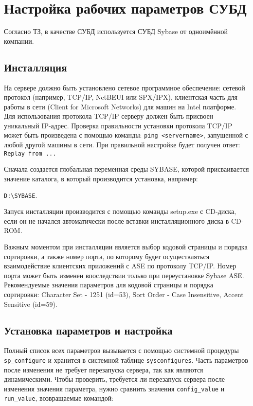\newpage

\section{Настройка рабочих параметров СУБД}

Согласно ТЗ, в качестве СУБД используется СУБД Sybase от одноимённой компании.

\subsection{Инсталляция}

На сервере должно быть установлено сетевое программное обеспечение: сетевой протокол (например, TCP/IP, NetBEUI или SPX/IPX), клиентская часть для работы в сети (Client for Microsoft Networks) для машин на Intel платформе. Для использования протокола TCP/IP серверу должен быть присвоен уникальный IP-адрес. Проверка правильности установки протокола TCP/IP может быть произведена с помощью команды: \verb|ping <servername>|, запущенной с любой другой машины в сети. При правильной настройке будет получен ответ: \verb|Replay from ...|\par\bigskip

Сначала создается глобальная переменная среды SYBASE, которой присваивается значение каталога, в который производится установка, например:

\verb|D:\SYBASE|.\par\bigskip

Запуск инсталляции производится с помощью команды setup.exe с CD-диска, если он не начался автоматически после вставки инсталляционного диска в CD-ROM.\par\bigskip

Важным моментом при инсталляции является выбор кодовой страницы и порядка сортировки, а также номер порта, по которому будет осуществляться взаимодействие клиентских приложений с ASE по протоколу TCP/IP. Номер порта может быть изменен впоследствии только при переустановке Sybase ASE. Рекомендуемые значения параметров для кодовой страницы и порядка сортировки: Character Set - 1251 (id=53), Sort Order - Case Insensitive, Accent Sensitive (id=59).\par\bigskip

\subsection{Установка параметров и настройка}

Полный список всех параметров вызывается с помощью системной процедуры \verb|sp_configure| и хранится в системной таблице \verb|sysconfigures|. Часть параметров после изменения не требует перезапуска сервера, так как являются динамическими. Чтобы проверить, требуется ли перезапуск сервера после изменения значения параметра, нужно сравнить значения \verb|config_value| и \verb|run_value|, возвращаемые командой:

